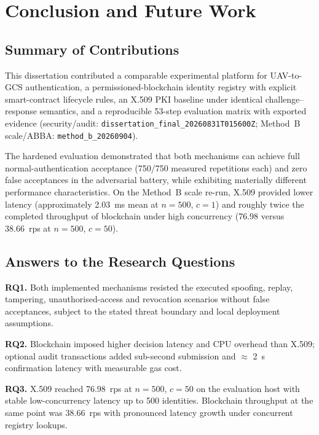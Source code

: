 
\chapter{Conclusion and Future Work}
\label{chap:conclusion}

\section{Summary of Contributions}
\label{sec:conclusion-contributions}

This dissertation contributed a comparable experimental platform for UAV-to-GCS authentication, a permissioned-blockchain identity registry with explicit smart-contract lifecycle rules, an X.509 PKI baseline under identical challenge--response semantics, and a reproducible 53-step evaluation matrix with exported evidence (security/audit: \texttt{dissertation\_final\_20260831T015600Z}; Method~B scale/ABBA: \texttt{method\_b\_20260904}).

The hardened evaluation demonstrated that both mechanisms can achieve full normal-authentication acceptance (750/750 measured repetitions each) and zero false acceptances in the adversarial battery, while exhibiting materially different performance characteristics. On the Method~B scale re-run, X.509 provided lower latency (approximately 2.03~ms mean at $n=500$, $c=1$) and roughly twice the completed throughput of blockchain under high concurrency (76.98 versus 38.66~rps at $n=500$, $c=50$).

\section{Answers to the Research Questions}
\label{sec:conclusion-rqs}

\textbf{RQ1.} Both implemented mechanisms resisted the executed spoofing, replay, tampering, unauthorised-access and revocation scenarios without false acceptances, subject to the stated threat boundary and local deployment assumptions.

\textbf{RQ2.} Blockchain imposed higher decision latency and CPU overhead than X.509; optional audit transactions added sub-second submission and $\approx$ 2~s confirmation latency with measurable gas cost.

\textbf{RQ3.} X.509 reached 76.98~rps at $n=500$, $c=50$ on the evaluation host with stable low-concurrency latency up to 500 identities. Blockchain throughput at the same point was 38.66~rps with pronounced latency growth under concurrent registry lookups.

